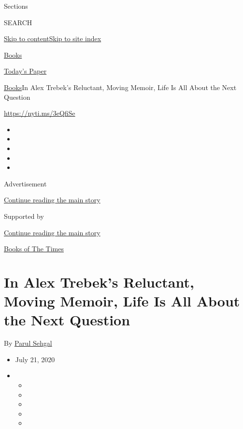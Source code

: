 Sections

SEARCH

\protect\hyperlink{site-content}{Skip to
content}\protect\hyperlink{site-index}{Skip to site index}

\href{https://www.nytimes3xbfgragh.onion/section/books}{Books}

\href{https://myaccount.nytimes3xbfgragh.onion/auth/login?response_type=cookie\&client_id=vi}{}

\href{https://www.nytimes3xbfgragh.onion/section/todayspaper}{Today's
Paper}

\href{/section/books}{Books}\textbar{}In Alex Trebek's Reluctant, Moving
Memoir, Life Is All About the Next Question

\url{https://nyti.ms/3eQfiSe}

\begin{itemize}
\item
\item
\item
\item
\item
\end{itemize}

Advertisement

\protect\hyperlink{after-top}{Continue reading the main story}

Supported by

\protect\hyperlink{after-sponsor}{Continue reading the main story}

\href{/column/books-of-the-times}{Books of The Times}

\hypertarget{in-alex-trebeks-reluctant-moving-memoir-life-is-all-about-the-next-question}{%
\section{In Alex Trebek's Reluctant, Moving Memoir, Life Is All About
the Next
Question}\label{in-alex-trebeks-reluctant-moving-memoir-life-is-all-about-the-next-question}}

By \href{https://www.nytimes3xbfgragh.onion/by/parul-sehgal}{Parul
Sehgal}

\begin{itemize}
\item
  July 21, 2020
\item
  \begin{itemize}
  \item
  \item
  \item
  \item
  \item
  \end{itemize}
\end{itemize}

